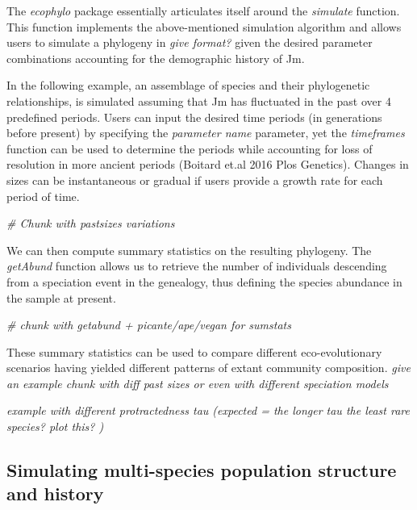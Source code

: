 \documentclass[
]{article}
\newenvironment{Shaded}{\begin{snugshade}}{\end{snugshade}}
\newcommand{\CommentTok}[1]{\textcolor[rgb]{0.56,0.35,0.01}{\textit{#1}}}
\begin{document}
The \emph{ecophylo} package essentially articulates itself around the
\emph{simulate} function. This function implements the above-mentioned
simulation algorithm and allows users to simulate a phylogeny in
\emph{give format?} given the desired parameter combinations accounting
for the demographic history of Jm.

In the following example, an assemblage of species and their
phylogenetic relationships, is simulated assuming that Jm has fluctuated
in the past over 4 predefined periods. Users can input the desired time
periods (in generations before present) by specifying the
\emph{parameter name} parameter, yet the \emph{timeframes} function can
be used to determine the periods while accounting for loss of resolution
in more ancient periods (Boitard et.al 2016 Plos Genetics). Changes in
sizes can be instantaneous or gradual if users provide a growth rate for
each period of time.

\begin{Shaded}
\begin{Highlighting}[]
\CommentTok{\# Chunk with pastsizes variations }
\end{Highlighting}
\end{Shaded}

We can then compute summary statistics on the resulting phylogeny. The
\emph{getAbund} function allows us to retrieve the number of individuals
descending from a speciation event in the genealogy, thus defining the
species abundance in the sample at present.

\begin{Shaded}
\begin{Highlighting}[]
\CommentTok{\# chunk with getabund + picante/ape/vegan for sumstats}
\end{Highlighting}
\end{Shaded}

These summary statistics can be used to compare different
eco-evolutionary scenarios having yielded different patterns of extant
community composition. \emph{give an example chunk with diff past sizes
or even with different speciation models}

\emph{example with different protractedness tau (expected = the longer
tau the least rare species? plot this? )}

\hypertarget{simulating-multi-species-population-structure-and-history}{%
\subsection{Simulating multi-species population structure and
history}\label{simulating-multi-species-population-structure-and-history}}
\end{document}
